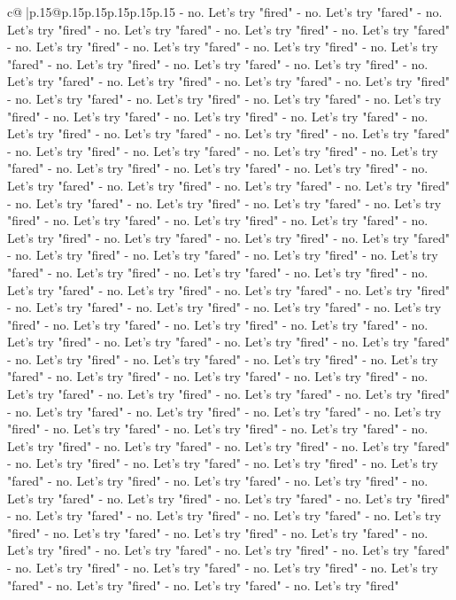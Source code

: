 \documentclass{article}
\begin{document}
{\begin{supertabular}{c@{$\;$}|p{.15\linewidth}@{}p{.15\linewidth}p{.15\linewidth}p{.15\linewidth}p{.15\linewidth}p{.15\linewidth}}
{{{{-} no. Let's try "fired" {-} no. Let's try "fared" {-} no. Let's try "fired" {-} no. Let's try "fared" {-} no. Let's try "fired" {-} no. Let's try "fared" {-} no. Let's try "fired" {-} no. Let's try "fared" {-} no. Let's try "fired" {-} no. Let's try "fared" {-} no. Let's try "fired" {-} no. Let's try "fared" {-} no. Let's try "fired" {-} no. Let's try "fared" {-} no. Let's try "fired" {-} no. Let's try "fared" {-} no. Let's try "fired" {-} no. Let's try "fared" {-} no. Let's try "fired" {-} no. Let's try "fared" {-} no. Let's try "fired" {-} no. Let's try "fared" {-} no. Let's try "fired" {-} no. Let's try "fared" {-} no. Let's try "fired" {-} no. Let's try "fared" {-} no. Let's try "fired" {-} no. Let's try "fared" {-} no. Let's try "fired" {-} no. Let's try "fared" {-} no. Let's try "fired" {-} no. Let's try "fared" {-} no. Let's try "fired" {-} no. Let's try "fared" {-} no. Let's try "fired" {-} no. Let's try "fared" {-} no. Let's try "fired" {-} no. Let's try "fared" {-} no. Let's try "fired" {-} no. Let's try "fared" {-} no. Let's try "fired" {-} no. Let's try "fared" {-} no. Let's try "fired" {-} no. Let's try "fared" {-} no. Let's try "fired" {-} no. Let's try "fared" {-} no. Let's try "fired" {-} no. Let's try "fared" {-} no. Let's try "fired" {-} no. Let's try "fared" {-} no. Let's try "fired" {-} no. Let's try "fared" {-} no. Let's try "fired" {-} no. Let's try "fared" {-} no. Let's try "fired" {-} no. Let's try "fared" {-} no. Let's try "fired" {-} no. Let's try "fared" {-} no. Let's try "fired" {-} no. Let's try "fared" {-} no. Let's try "fired" {-} no. Let's try "fared" {-} no. Let's try "fired" {-} no. Let's try "fared" {-} no. Let's try "fired" {-} no. Let's try "fared" {-} no. Let's try "fired" {-} no. Let's try "fared" {-} no. Let's try "fired" {-} no. Let's try "fared" {-} no. Let's try "fired" {-} no. Let's try "fared" {-} no. Let's try "fired" {-} no. Let's try "fared" {-} no. Let's try "fired" {-} no. Let's try "fared" {-} no. Let's try "fired" {-} no. Let's try "fared" {-} no. Let's try "fired" {-} no. Let's try "fared" {-} no. Let's try "fired" {-} no. Let's try "fared" {-} no. Let's try "fired" {-} no. Let's try "fared" {-} no. Let's try "fired" {-} no. Let's try "fared" {-} no. Let's try "fired" {-} no. Let's try "fared" {-} no. Let's try "fired" {-} no. Let's try "fared" {-} no. Let's try "fired" {-} no. Let's try "fared" {-} no. Let's try "fired" {-} no. Let's try "fared" {-} no. Let's try "fired" {-} no. Let's try "fared" {-} no. Let's try "fired" {-} no. Let's try "fared" {-} no. Let's try "fired" {-} no. Let's try "fared" {-} no. Let's try "fired" {-} no. Let's try "fared" {-} no. Let's try "fired" {-} no. Let's try "fared" {-} no. Let's try "fired" {-} no. Let's try "fared" {-} no. Let's try "fired" {-} no. Let's try "fared" {-} no. Let's try "fired" {-} no. Let's try "fared" {-} no. Let's try "fired" {-} no. Let's try "fared" {-} no. Let's try "fired" {-} no. Let's try "fared" {-} no. Let's try "fired" {-} no. Let's try "fared" {-} no. Let's try "fired" {-} no. Let's try "fared" {-} no. Let's try "fired" {-} no. Let's try "fared" {-} no. Let's try "fired" {-} no. Let's try "fared" {-} no. Let's try "fired" }}}
\end{supertabular}}
\end{document}
